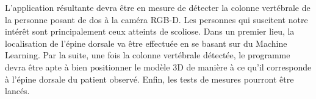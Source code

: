 \documentclass[a4paper, 12pt]{book}
\newcounter{program}[subsection]
\begin{document}
\par L'application résultante devra être en mesure de détecter la colonne vertébrale de la personne posant de dos à la caméra RGB-D. Les personnes qui suscitent notre intérêt sont principalement ceux atteints de scoliose. Dans un premier lieu, la localisation de l'épine dorsale va être effectuée en se basant sur du Machine Learning. Par la suite, une fois la colonne vertébrale détectée, le programme devra être apte à bien positionner le modèle 3D de manière à ce qu'il corresponde à l'épine dorsale du patient observé. Enfin, les tests de mesures pourront être lancés.


\nocite{*}


%
%

%
\end{document}
